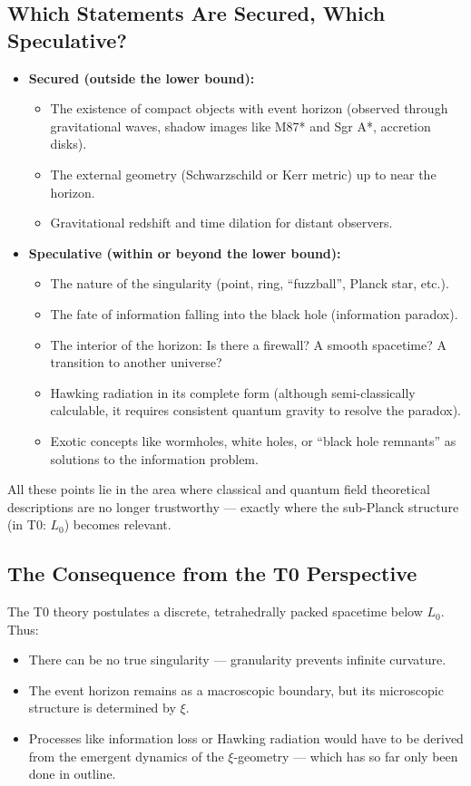 	\subsection{Which Statements Are Secured, Which Speculative?}
	\begin{itemize}
		\item \textbf{Secured (outside the lower bound):}
		\begin{itemize}
			\item The existence of compact objects with event horizon (observed through gravitational waves, shadow images like M87* and Sgr A*, accretion disks).
			\item The external geometry (Schwarzschild or Kerr metric) up to near the horizon.
			\item Gravitational redshift and time dilation for distant observers.
		\end{itemize}
		
		\item \textbf{Speculative (within or beyond the lower bound):}
		\begin{itemize}
			\item The nature of the singularity (point, ring, ``fuzzball'', Planck star, etc.).
			\item The fate of information falling into the black hole (information paradox).
			\item The interior of the horizon: Is there a firewall? A smooth spacetime? A transition to another universe?
			\item Hawking radiation in its complete form (although semi-classically calculable, it requires consistent quantum gravity to resolve the paradox).
			\item Exotic concepts like wormholes, white holes, or ``black hole remnants'' as solutions to the information problem.
		\end{itemize}
	\end{itemize}
	
	All these points lie in the area where classical and quantum field theoretical descriptions are no longer trustworthy --- exactly where the sub-Planck structure (in T0: $L_0$) becomes relevant.
	
	\subsection{The Consequence from the T0 Perspective}
	The T0 theory postulates a discrete, tetrahedrally packed spacetime below $L_0$. Thus:
	\begin{itemize}
		\item There can be no true singularity --- granularity prevents infinite curvature.
		\item The event horizon remains as a macroscopic boundary, but its microscopic structure is determined by $\xi$.
		\item Processes like information loss or Hawking radiation would have to be derived from the emergent dynamics of the $\xi$-geometry --- which has so far only been done in outline.
	\end{itemize}
	
